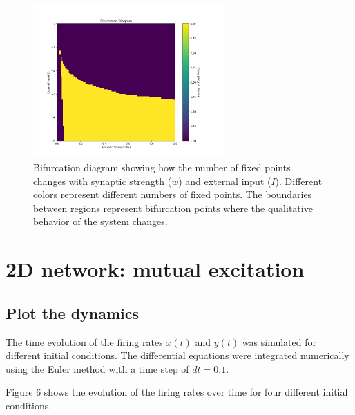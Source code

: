 \documentclass{article}
\begin{document}
\begin{figure}[H]
    \centering
    \includegraphics[width=0.65\textwidth]{bifurcation_diagram.png}
    \caption{Bifurcation diagram showing how the number of fixed points changes with synaptic strength ($w$) and external input ($I$). Different colors represent different numbers of fixed points. The boundaries between regions represent bifurcation points where the qualitative behavior of the system changes.}
    \label{fig:bifurcation}
\end{figure}




\section{2D network: mutual excitation}

\subsection{Plot the dynamics}

The time evolution of the firing rates $x(t)$ and $y(t)$ was simulated for different initial conditions. The differential equations were integrated numerically using the Euler method with a time step of $dt = 0.1$.

Figure 6 shows the evolution of the firing rates over time for four different initial conditions.
\end{document}
